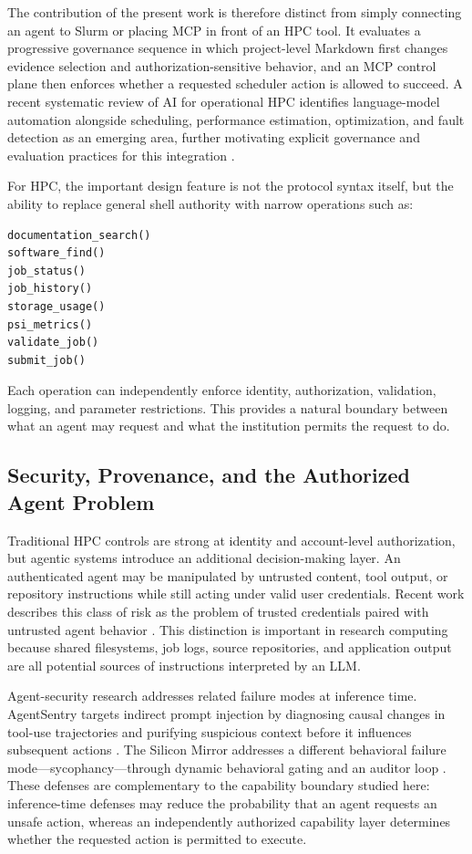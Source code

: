 \documentclass[11pt]{article}
\begin{document}
The contribution of the present work is therefore distinct from simply connecting an agent to Slurm or placing MCP in front of an HPC tool. It evaluates a progressive governance sequence in which project-level Markdown first changes evidence selection and authorization-sensitive behavior, and an MCP control plane then enforces whether a requested scheduler action is allowed to succeed. A recent systematic review of AI for operational HPC identifies language-model automation alongside scheduling, performance estimation, optimization, and fault detection as an emerging area, further motivating explicit governance and evaluation practices for this integration \cite{pochelu2026aihpc}.

For HPC, the important design feature is not the protocol syntax itself, but the ability to replace general shell authority with narrow operations such as:

\begin{lstlisting}
documentation_search()
software_find()
job_status()
job_history()
storage_usage()
psi_metrics()
validate_job()
submit_job()
\end{lstlisting}

Each operation can independently enforce identity, authorization, validation, logging, and parameter restrictions. This provides a natural boundary between what an agent may request and what the institution permits the request to do.

\subsection{Security, Provenance, and the Authorized Agent Problem}

Traditional HPC controls are strong at identity and account-level authorization, but agentic systems introduce an additional decision-making layer. An authenticated agent may be manipulated by untrusted content, tool output, or repository instructions while still acting under valid user credentials. Recent work describes this class of risk as the problem of trusted credentials paired with untrusted agent behavior \cite{li2026trusted}. This distinction is important in research computing because shared filesystems, job logs, source repositories, and application output are all potential sources of instructions interpreted by an LLM.

Agent-security research addresses related failure modes at inference time. AgentSentry targets indirect prompt injection by diagnosing causal changes in tool-use trajectories and purifying suspicious context before it influences subsequent actions \cite{zhang2026agentsentry}. The Silicon Mirror addresses a different behavioral failure mode---sycophancy---through dynamic behavioral gating and an auditor loop \cite{shah2026siliconmirror}. These defenses are complementary to the capability boundary studied here: inference-time defenses may reduce the probability that an agent requests an unsafe action, whereas an independently authorized capability layer determines whether the requested action is permitted to execute.
\end{document}
